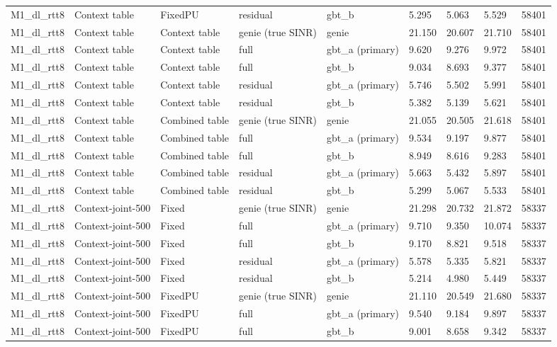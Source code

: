 \documentclass[10pt]{article}
\begin{document}
\begin{landscape}
\begin{longtable}{@{}lllllllll@{}}
M1\_dl\_rtt8 & Context table & FixedPU & residual & gbt\_b & 5.295 & 5.063 & 5.529 & 58401 \\
M1\_dl\_rtt8 & Context table & Context table & genie (true SINR) & genie & 21.150 & 20.607 & 21.710 & 58401 \\
M1\_dl\_rtt8 & Context table & Context table & full & gbt\_a (primary) & 9.620 & 9.276 & 9.972 & 58401 \\
M1\_dl\_rtt8 & Context table & Context table & full & gbt\_b & 9.034 & 8.693 & 9.377 & 58401 \\
M1\_dl\_rtt8 & Context table & Context table & residual & gbt\_a (primary) & 5.746 & 5.502 & 5.991 & 58401 \\
M1\_dl\_rtt8 & Context table & Context table & residual & gbt\_b & 5.382 & 5.139 & 5.621 & 58401 \\
M1\_dl\_rtt8 & Context table & Combined table & genie (true SINR) & genie & 21.055 & 20.505 & 21.618 & 58401 \\
M1\_dl\_rtt8 & Context table & Combined table & full & gbt\_a (primary) & 9.534 & 9.197 & 9.877 & 58401 \\
M1\_dl\_rtt8 & Context table & Combined table & full & gbt\_b & 8.949 & 8.616 & 9.283 & 58401 \\
M1\_dl\_rtt8 & Context table & Combined table & residual & gbt\_a (primary) & 5.663 & 5.432 & 5.897 & 58401 \\
M1\_dl\_rtt8 & Context table & Combined table & residual & gbt\_b & 5.299 & 5.067 & 5.533 & 58401 \\
M1\_dl\_rtt8 & Context-joint-500 & Fixed & genie (true SINR) & genie & 21.298 & 20.732 & 21.872 & 58337 \\
M1\_dl\_rtt8 & Context-joint-500 & Fixed & full & gbt\_a (primary) & 9.710 & 9.350 & 10.074 & 58337 \\
M1\_dl\_rtt8 & Context-joint-500 & Fixed & full & gbt\_b & 9.170 & 8.821 & 9.518 & 58337 \\
M1\_dl\_rtt8 & Context-joint-500 & Fixed & residual & gbt\_a (primary) & 5.578 & 5.335 & 5.821 & 58337 \\
M1\_dl\_rtt8 & Context-joint-500 & Fixed & residual & gbt\_b & 5.214 & 4.980 & 5.449 & 58337 \\
M1\_dl\_rtt8 & Context-joint-500 & FixedPU & genie (true SINR) & genie & 21.110 & 20.549 & 21.680 & 58337 \\
M1\_dl\_rtt8 & Context-joint-500 & FixedPU & full & gbt\_a (primary) & 9.540 & 9.184 & 9.897 & 58337 \\
M1\_dl\_rtt8 & Context-joint-500 & FixedPU & full & gbt\_b & 9.001 & 8.658 & 9.342 & 58337 \\

\end{longtable}
\end{landscape}
\end{document}

